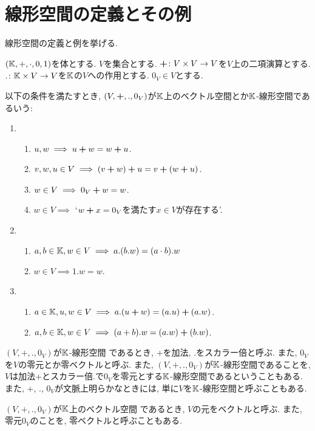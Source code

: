 \section{線形空間の定義とその例}
線形空間の定義と例を挙げる.

\begin{definition}
  $(\mathbb{K},+,\cdot,0,1)$を体とする.
  $V$を集合とする.
  $\mathbin{\boldsymbol{+}}\colon V\times V \to V$を$V$上の二項演算とする.
  $.\colon \mathbb{K}\times V \to V$を$\mathbb{K}$の$V$への作用とする.
  $0_V \in V$とする.

  以下の条件を満たすとき,
  $(V,\mathbin{\boldsymbol{+}},.,0_V)$が$\mathbb{K}$上のベクトル空間とか$\mathbb{K}$-線形空間であるいう:
  \begin{enumerate}
  \item 
    \begin{enumerate}
    \item $u,w\implies  u\mathbin{\boldsymbol{+}} w=w\mathbin{\boldsymbol{+}} u$.
    \item
      \label{def:vecsp:item:sum:ass}
      $v,w,u\in V \implies (v\mathbin{\boldsymbol{+}} w)\mathbin{\boldsymbol{+}} u=v\mathbin{\boldsymbol{+}} (w\mathbin{\boldsymbol{+}} u)$.
    \item $w\in V \implies 0_V\mathbin{\boldsymbol{+}} w=w$.
    \item $w\in V\implies $ `$w\mathbin{\boldsymbol{+}} x=0_V$を満たす$x\in V$が存在する'.
    \end{enumerate}
  \item
    \begin{enumerate}
    \item
      \label{def:vecsp:item:prod:ass}
      $a,b\in\mathbb{K}, w\in V \implies a.(b.w)=(a\cdot b).w$
    \item $w\in V \implies 1.w=w$.
    \end{enumerate}
  \item
    \begin{enumerate}
    \item $a\in \mathbb{K},u,w\in V \implies a.(u\mathbin{\boldsymbol{+}} w)=(a.u)\mathbin{\boldsymbol{+}} (a.w)$.
    \item $a,b\in\mathbb{K}, w\in V\implies (a+b).w=(a.w)\mathbin{\boldsymbol{+}} (b.w)$.
    \end{enumerate}
  \end{enumerate}
\end{definition}
\begin{remark}
  $(V,+,.,0_V)$が$\mathbb{K}$-線形空間
  であるとき,
  $+$を加法, $.$をスカラー倍と呼ぶ.
  また, $0_V$を$V$の零元とか零ベクトルと呼ぶ.
  また, 
  $(V,+,.,0_V)$が$\mathbb{K}$-線形空間であることを,
  $V$は加法$+$とスカラー倍$.$で$0_V$を零元とする$\mathbb{K}$-線形空間であるということもある.
  また, $+$, $.$, $0_V$が文脈上明らかなときには,
  単に$V$を$\mathbb{K}$-線形空間と呼ぶこともある.
\end{remark}
\begin{remark}
  $(V,+,.,0_V)$が$\mathbb{K}$上のベクトル空間
  であるとき,
  $V$の元をベクトルと呼ぶ.
  また, 零元$0_V$のことを, 零ベクトルと呼ぶこともある.
\end{remark}


